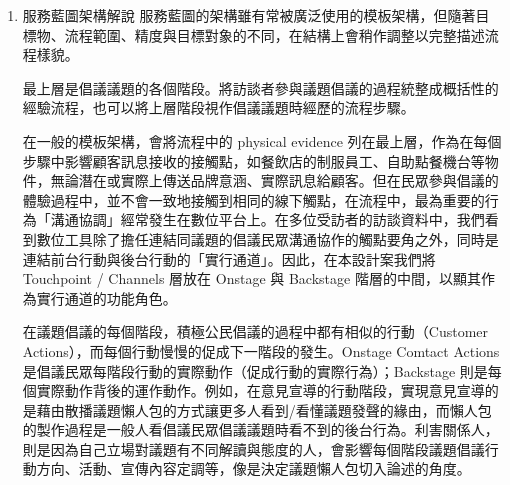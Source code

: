 \documentclass[12pt,a4paper]{article}
\begin{document}
\begin{enumerate}
\item 服務藍圖架構解說
\label{sec:org72d110d}
服務藍圖的架構雖有常被廣泛使用的模板架構，但隨著目標物、流程範圍、精度與目標對象的不同，在結構上會稍作調整以完整描述流程樣貌。

最上層是倡議議題的各個階段。將訪談者參與議題倡議的過程統整成概括性的經驗流程，也可以將上層階段視作倡議議題時經歷的流程步驟。

在一般的模板架構，會將流程中的 physical evidence 列在最上層，作為在每個步驟中影響顧客訊息接收的接觸點，如餐飲店的制服員工、自助點餐機台等物件，無論潛在或實際上傳送品牌意涵、實際訊息給顧客。但在民眾參與倡議的體驗過程中，並不會一致地接觸到相同的線下觸點，在流程中，最為重要的行為「溝通協調」經常發生在數位平台上。在多位受訪者的訪談資料中，我們看到數位工具除了擔任連結同議題的倡議民眾溝通協作的觸點要角之外，同時是連結前台行動與後台行動的「實行通道」。因此，在本設計案我們將 Touchpoint / Channels 層放在 Onstage 與 Backstage 階層的中間，以顯其作為實行通道的功能角色。

在議題倡議的每個階段，積極公民倡議的過程中都有相似的行動（Customer Actions），而每個行動慢慢的促成下一階段的發生。Onstage Comtact Actions 是倡議民眾每階段行動的實際動作（促成行動的實際行為）；Backstage 則是每個實際動作背後的運作動作。例如，在意見宣導的行動階段，實現意見宣導的是藉由散播議題懶人包的方式讓更多人看到/看懂議題發聲的緣由，而懶人包的製作過程是一般人看倡議民眾倡議議題時看不到的後台行為。利害關係人，則是因為自己立場對議題有不同解讀與態度的人，會影響每個階段議題倡議行動方向、活動、宣傳內容定調等，像是決定議題懶人包切入論述的角度。


\end{enumerate}
\end{document}
